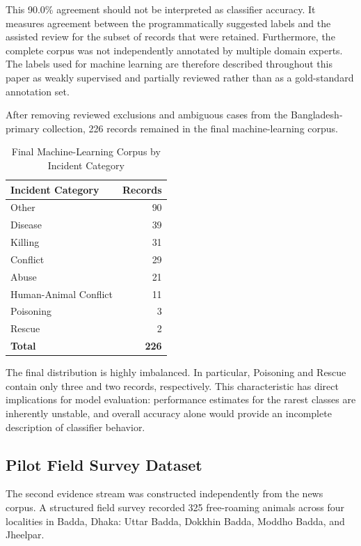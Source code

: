 \documentclass[conference]{IEEEtran}
\begin{document}
This 90.0\% agreement should not be interpreted as classifier accuracy.
It measures agreement between the programmatically suggested labels and the
assisted review for the subset of records that were retained. Furthermore,
the complete corpus was not independently annotated by multiple domain
experts. The labels used for machine learning are therefore described
throughout this paper as weakly supervised and partially reviewed rather
than as a gold-standard annotation set.

After removing reviewed exclusions and ambiguous cases from the
Bangladesh-primary collection, 226 records remained in the final
machine-learning corpus.

\begin{table}[!t]
\centering
\caption{Final Machine-Learning Corpus by Incident Category}
\label{tab:final_classes}
\renewcommand{\arraystretch}{1.15}
\begin{tabular}{lr}
\toprule
\textbf{Incident Category} & \textbf{Records} \\
\midrule
Other                     & 90 \\
Disease                   & 39 \\
Killing                   & 31 \\
Conflict                  & 29 \\
Abuse                     & 21 \\
Human-Animal Conflict     & 11 \\
Poisoning                 & 3 \\
Rescue                    & 2 \\
\midrule
\textbf{Total}            & \textbf{226} \\
\bottomrule
\end{tabular}
\end{table}

The final distribution is highly imbalanced. In particular, Poisoning and
Rescue contain only three and two records, respectively. This characteristic
has direct implications for model evaluation: performance estimates for the
rarest classes are inherently unstable, and overall accuracy alone would
provide an incomplete description of classifier behavior.

\subsection{Pilot Field Survey Dataset}

The second evidence stream was constructed independently from the news
corpus. A structured field survey recorded 325 free-roaming animals across
four localities in Badda, Dhaka: Uttar Badda, Dokkhin Badda, Moddho Badda,
and Jheelpar.
\end{document}
